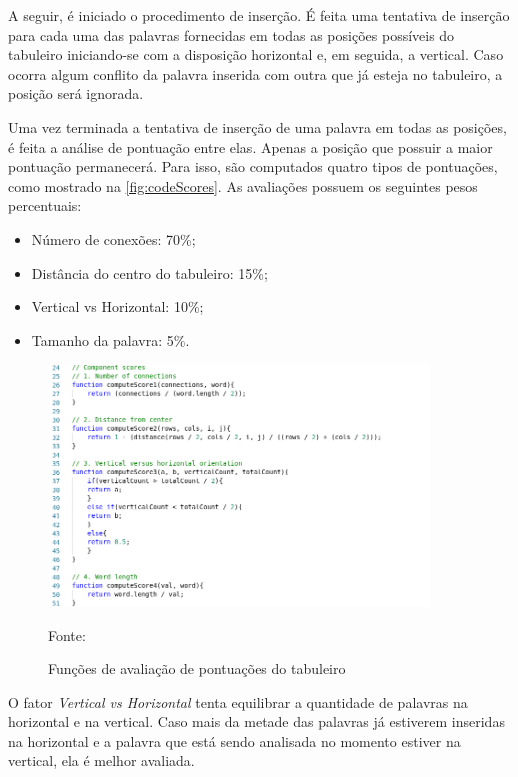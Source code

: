 A seguir, é iniciado o procedimento de inserção. É feita uma tentativa de inserção para cada uma das palavras fornecidas em todas as posições possíveis do tabuleiro iniciando-se com a disposição horizontal e, em seguida, a vertical. Caso ocorra algum conflito da palavra inserida com outra que já esteja no tabuleiro, a posição será ignorada. 

Uma vez terminada a tentativa de inserção de uma palavra em todas as posições, é feita a análise de pontuação entre elas. Apenas a posição que possuir a maior pontuação permanecerá. Para isso, são computados quatro tipos de pontuações, como mostrado na \autoref{fig:codeScores}. As avaliações possuem os seguintes pesos percentuais:

\begin{itemize}
    \item Número de conexões: 70\%;
    \item Distância do centro do tabuleiro: 15\%;
    \item Vertical vs Horizontal: 10\%;
    \item Tamanho da palavra: 5\%.
\end{itemize}

\begin{figure}[H]
\centering
    \caption{Funções de avaliação de pontuações do tabuleiro}
    \label{fig:codeScores}
    \includegraphics[width=0.9\textwidth]{Figuras/codeComponentScores.png}
    
    Fonte: \cite{layoutGenerator}
\end{figure}

O fator \textit{Vertical vs Horizontal} tenta equilibrar a quantidade de palavras na horizontal e na vertical. Caso mais da metade das palavras já estiverem inseridas na horizontal e a palavra que está sendo analisada no momento estiver na vertical, ela é melhor avaliada.

